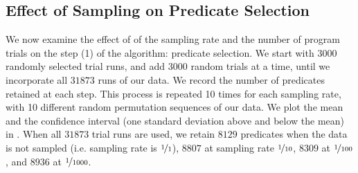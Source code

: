\subsection{Effect of Sampling on Predicate Selection}

We now examine the effect of of the sampling rate and the number of
program trials on the step (1) of the algorithm: predicate selection.
We start with $3000$ randomly
selected trial runs, and add $3000$ random trials at a time, until we
incorporate all $31873$ runs of our data.  We record the number of
predicates retained at each step.  This process is repeated 10 times
for each sampling rate, with 10 different random permutation sequences
of our data. We plot the mean and the confidence interval (one
standard deviation above and below the mean) in
.  When all $31873$ trial
runs are used, we retain $8129$ predicates when the data is not
sampled (i.e. sampling rate is $\nicefrac{1}{1}$), $8807$ at sampling
rate $\nicefrac{1}{10}$, $8309$ at $\nicefrac{1}{100}$, and $8936$ at
$\nicefrac{1}{1000}$.

